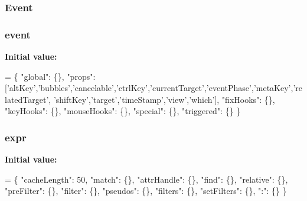 \subsubsection[{Event}]{ Event}\label{jquery-1_810_82-vsdoc_8js_a2cc2bb482e56b47f47b4ee54d670a418}
\hypertarget{jquery-1_810_82-vsdoc_8js_a2ece9eec3df1cd48d8203e336e83563e}{}
\subsubsection[{event}]{ event}\label{jquery-1_810_82-vsdoc_8js_a2ece9eec3df1cd48d8203e336e83563e}
{\bfseries Initial value\+:}
\begin{DoxyCode}
= \{ \textcolor{stringliteral}{"global"}: \{\},
\textcolor{stringliteral}{"props"}: [\textcolor{stringliteral}{'altKey'},\textcolor{stringliteral}{'bubbles'},\textcolor{stringliteral}{'cancelable'},\textcolor{stringliteral}{'ctrlKey'},\textcolor{stringliteral}{'currentTarget'},\textcolor{stringliteral}{'eventPhase'},\textcolor{stringliteral}{'metaKey'},\textcolor{stringliteral}{'relatedTarget'},\textcolor{stringliteral}{
      'shiftKey'},\textcolor{stringliteral}{'target'},\textcolor{stringliteral}{'timeStamp'},\textcolor{stringliteral}{'view'},\textcolor{stringliteral}{'which'}],
\textcolor{stringliteral}{"fixHooks"}: \{\},
\textcolor{stringliteral}{"keyHooks"}: \{\},
\textcolor{stringliteral}{"mouseHooks"}: \{\},
\textcolor{stringliteral}{"special"}: \{\},
\textcolor{stringliteral}{"triggered"}: \{\} \}
\end{DoxyCode}
\hypertarget{jquery-1_810_82-vsdoc_8js_aaacd1d5b3593ba4dfff6d67d4f6cfda1}{}
\subsubsection[{expr}]{ expr}\label{jquery-1_810_82-vsdoc_8js_aaacd1d5b3593ba4dfff6d67d4f6cfda1}
{\bfseries Initial value\+:}
\begin{DoxyCode}
= \{ \textcolor{stringliteral}{"cacheLength"}: 50,
\textcolor{stringliteral}{"match"}: \{\},
\textcolor{stringliteral}{"attrHandle"}: \{\},
\textcolor{stringliteral}{"find"}: \{\},
\textcolor{stringliteral}{"relative"}: \{\},
\textcolor{stringliteral}{"preFilter"}: \{\},
\textcolor{stringliteral}{"filter"}: \{\},
\textcolor{stringliteral}{"pseudos"}: \{\},
\textcolor{stringliteral}{"filters"}: \{\},
\textcolor{stringliteral}{"setFilters"}: \{\},
\textcolor{stringliteral}{":"}: \{\} \}
\end{DoxyCode}
\hypertarget{jquery-1_810_82-vsdoc_8js_abe9202d916a92ab0ff198ee3f394b395}{}
